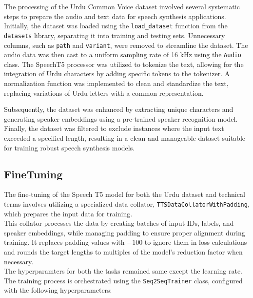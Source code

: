 \documentclass[conference]{IEEEtran}
\begin{document}
The processing of the Urdu Common Voice dataset involved several systematic steps to prepare the audio and text data for speech synthesis applications. Initially, the dataset was loaded using the \texttt{load\_dataset} function from the \texttt{datasets} library, separating it into training and testing sets. Unnecessary columns, such as \texttt{path} and \texttt{variant}, were removed to streamline the dataset. The audio data was then cast to a uniform sampling rate of 16 kHz using the \texttt{Audio} class. The SpeechT5 processor was utilized to tokenize the text, allowing for the integration of Urdu characters by adding specific tokens to the tokenizer. A normalization function was implemented to clean and standardize the text, replacing variations of Urdu letters with a common representation.  

Subsequently, the dataset was enhanced by extracting unique characters and generating speaker embeddings using a pre-trained speaker recognition model. Finally, the dataset was filtered to exclude instances where the input text exceeded a specified length, resulting in a clean and manageable dataset suitable for training robust speech synthesis models.

\subsection{FineTuning}

The fine-tuning of the Speech T5 model for both the Urdu dataset and technical terms involves utilizing a specialized data collator, \texttt{TTSDataCollatorWithPadding}, which prepares the input data for training. 
\\
This collator processes the data by creating batches of input IDs, labels, and speaker embeddings, while managing padding to ensure proper alignment during training. It replaces padding values with \(-100\) to ignore them in loss calculations and rounds the target lengths to multiples of the model's reduction factor when necessary. 
\\
The hyperparamters for both the tasks remained same except the learning rate.
\\
The training process is orchestrated using the \texttt{Seq2SeqTrainer} class, configured with the following hyperparameters:
\end{document}
